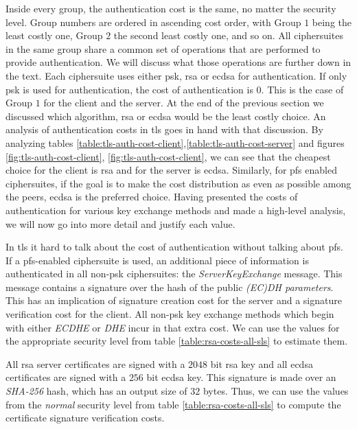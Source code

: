 \documentclass{llncs}
\begin{document}
Inside every group, the authentication cost is the same, no matter the security level. Group numbers are ordered in ascending cost order, with Group $1$
being the least costly one, Group $2$ the second least costly one, and so on. All ciphersuites in the same group share a common set of operations that
are performed to provide authentication. We will discuss what those operations are further down in the text. Each ciphersuite uses either \gls{psk},
\gls{rsa} or \gls{ecdsa} for authentication. If only \gls{psk} is used for authentication, the cost of authentication is $0$. This is the case of Group
$1$ for the client and the server. At the end of the previous section we discussed which algorithm, \gls{rsa} or \gls{ecdsa} would be the least costly
choice. An analysis of authentication costs in \gls{tls} goes in hand with that discussion. By analyzing tables \ref{table:tls-auth-cost-client},\ref{table:tls-auth-cost-server}
and figures \ref{fig:tls-auth-cost-client}, \ref{fig:tls-auth-cost-client}, we can see that the cheapest choice for the client is \gls{rsa} and for the
server is \gls{ecdsa}. Similarly, for \gls{pfs} enabled ciphersuites, if the goal is to make the cost distribution as even as possible among the peers,
\gls{ecdsa} is the preferred choice. Having presented the costs of authentication for various key exchange methods and made a high-level analysis, we will now go into more detail and
justify each value.

In \gls{tls} it hard to talk about the cost of authentication without  talking about \gls{pfs}. If a \gls{pfs}-enabled
ciphersuite is used, an additional piece of information is authenticated in all non-\gls{psk} ciphersuites: the \textit{ServerKeyExchange} message.
This message contains a signature over the hash of the public \textit{(EC)DH parameters}. This has an implication of signature creation cost
for the server and a signature verification cost for the client. All non-\gls{psk} key exchange methods which begin with either
\textit{ECDHE} or \textit{DHE} incur in that extra cost.  We can use the values for the appropriate security level from table
\ref{table:rsa-costs-all-sls} to estimate them.

All \gls{rsa} server certificates are signed with a $2048$ bit \gls{rsa} key and all \gls{ecdsa} certificates
are signed with a $256$ bit \gls{ecdsa} key. This signature is made over an \textit{SHA-256} hash, which has an output size of $32$ bytes.
Thus, we can use the values from the \textit{normal} security level from table \ref{table:rsa-costs-all-sls} to compute the certificate signature
verification costs.
\end{document}
